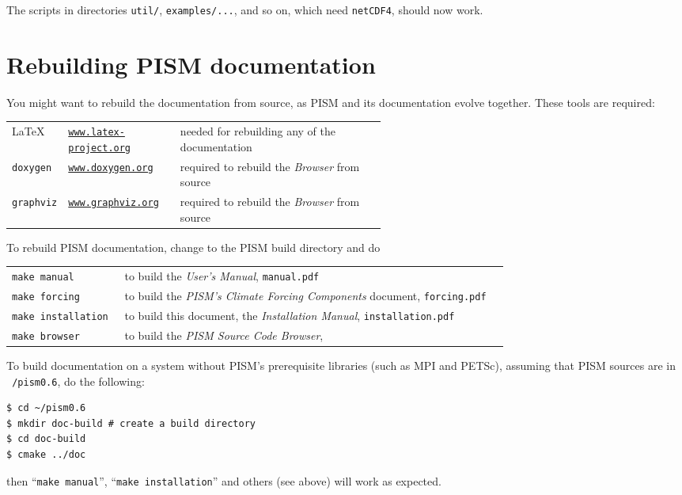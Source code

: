 \documentclass[titlepage,letterpaper,final]{scrartcl}
\begin{document}
The scripts in directories \texttt{util/}, \texttt{examples/...}, and so on,
which need \texttt{netCDF4}, should now work.

\section{Rebuilding PISM documentation}
\label{sec:docs}

You might want to rebuild the documentation from source, as PISM and its
documentation evolve together. These tools are required: \bigskip
\begin{center}
  \begin{tabular*}{0.9\linewidth}{llp{0.55\linewidth}}
    \toprule
    \LaTeX & \href{http://www.latex-project.org/}{\texttt{www.latex-project.org}} &  needed for rebuilding any of the documentation \\
    \texttt{doxygen}\index{doxygen} & \href{http://www.stack.nl/~dimitri/doxygen/}{\texttt{www.doxygen.org}} &  required to rebuild the \emph{Browser} from source  \\
    \texttt{graphviz}\index{graphviz} & \href{http://www.graphviz.org/}{\texttt{www.graphviz.org}} & required to rebuild the \emph{Browser} from source  \\
    \bottomrule
  \end{tabular*}
\end{center}
\bigskip
\noindent To rebuild PISM documentation, change to the PISM build directory and do
\begin{center}
  \begin{tabular}{p{0.22\linewidth}p{0.75\linewidth}}
    \texttt{make manual} & to build the \emph{User's Manual}, \texttt{manual.pdf}\\
    \texttt{make forcing} & to build the \emph{PISM's Climate Forcing
      Components} document, \texttt{forcing.pdf} \\
    \texttt{make installation} & to build this document, the \emph{Installation Manual}, \texttt{installation.pdf}\\
    \texttt{make browser} & to build the \emph{PISM Source Code Browser},\\
  \end{tabular}
\end{center}
\bigskip

To build documentation on a system without PISM's prerequisite
libraries (such as MPI and PETSc), assuming that PISM sources are in \texttt{~/pism0.6}, do the following:
\begin{verbatim}
$ cd ~/pism0.6
$ mkdir doc-build # create a build directory
$ cd doc-build
$ cmake ../doc
\end{verbatim}
then ``\texttt{make manual}'', ``\texttt{make installation}'' and
others (see above) will work as expected.
\end{document}
